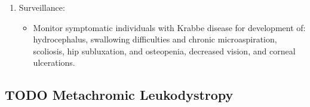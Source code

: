\documentclass{scrartcl}
\begin{document}
\begin{enumerate}
\begin{enumerate}
\begin{enumerate}
\item Surveillance:
\label{sec:orgea9ebe7}
\begin{itemize}
\item Monitor symptomatic individuals with Krabbe disease for
development of: hydrocephalus, swallowing difficulties and chronic
microaspiration, scoliosis, hip subluxation, and osteopenia,
decreased vision, and corneal ulcerations.
\end{itemize}
\end{enumerate}
\end{enumerate}
\end{enumerate}

\subsection{{\bfseries\sffamily TODO} Metachromic Leukodystropy}
\label{sec:orgaf2c3aa}
\end{document}
